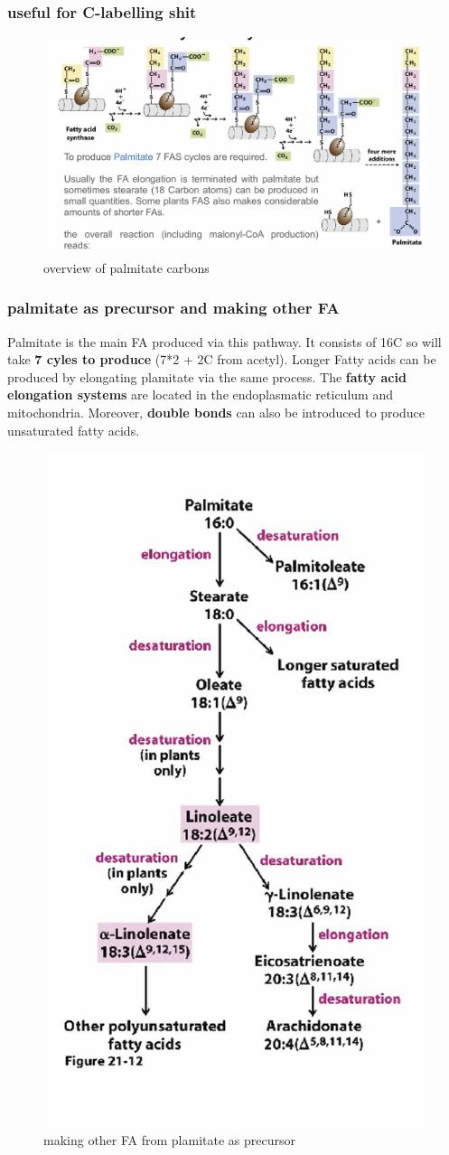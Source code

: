 \documentclass[../main.tex]{subfiles}
\begin{document}
\subsubsection{useful for C-labelling shit}
\begin{figure}[H]
    \centering
    \includegraphics[width=\linewidth]{overviewPalmitate.png}
    \caption{overview of palmitate carbons}
    \label{fig:enter-label}
\end{figure}


\subsubsection{palmitate as precursor and making other FA}
Palmitate is the main FA produced via this pathway. It consists of 16C so will take \textbf{7 cyles to produce} (7*2 + 2C from acetyl). Longer Fatty acids can be produced by elongating plamitate via the same process. The \textbf{fatty acid elongation systems} are located in the endoplasmatic reticulum and mitochondria. Moreover, \textbf{double bonds} can also be introduced to produce unsaturated fatty acids.
\begin{figure}[H]
    \centering
    \includegraphics[width=0.5\linewidth]{palmitate_stuff.png}
    \caption{making other FA from plamitate as precursor}
    \label{fig:enter-label}
\end{figure}
\end{document}
